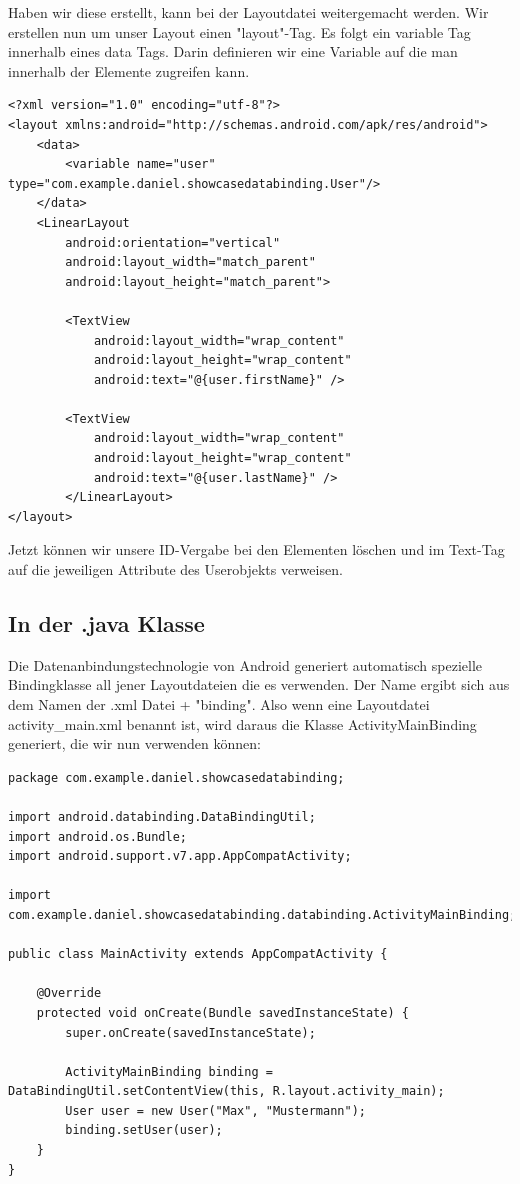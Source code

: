 \documentclass[FIPLY_base.tex]{subfiles}
\begin{document}
Haben wir diese erstellt, kann bei der Layoutdatei weitergemacht werden. Wir erstellen nun um unser Layout einen "layout"-Tag. Es folgt ein variable Tag innerhalb eines data Tags. Darin definieren wir eine Variable auf die man innerhalb der Elemente zugreifen kann.

\begin{lstlisting}[caption={Die XML Datei nach der Integration einer Datenanbindung.},label=DescriptiveLabel]
<?xml version="1.0" encoding="utf-8"?>
<layout xmlns:android="http://schemas.android.com/apk/res/android">
    <data>
	    <variable name="user" type="com.example.daniel.showcasedatabinding.User"/>
    </data>
    <LinearLayout
	    android:orientation="vertical"
	    android:layout_width="match_parent"
	    android:layout_height="match_parent">
    
	    <TextView
	        android:layout_width="wrap_content"
	        android:layout_height="wrap_content"
	        android:text="@{user.firstName}" />
		    
	    <TextView
	        android:layout_width="wrap_content"
	        android:layout_height="wrap_content"
	        android:text="@{user.lastName}" />
	    </LinearLayout>
</layout>
\end{lstlisting}


Jetzt können wir unsere ID-Vergabe bei den Elementen löschen und im Text-Tag auf die jeweiligen Attribute des Userobjekts verweisen.

\newpage
\subsection{In der .java Klasse}
Die Datenanbindungstechnologie von Android generiert automatisch spezielle Bindingklasse all jener Layoutdateien die es verwenden. Der Name ergibt sich aus dem Namen der .xml Datei + "binding". Also wenn eine Layoutdatei activity\_main.xml benannt ist, wird daraus die Klasse ActivityMainBinding generiert, die wir nun verwenden können:

\begin{lstlisting}[caption={Die Aktivitätenklasse nach der Integration einer Datenanbindung.},label=DescriptiveLabel]
package com.example.daniel.showcasedatabinding;

import android.databinding.DataBindingUtil;
import android.os.Bundle;
import android.support.v7.app.AppCompatActivity;

import com.example.daniel.showcasedatabinding.databinding.ActivityMainBinding;

public class MainActivity extends AppCompatActivity {

	@Override
	protected void onCreate(Bundle savedInstanceState) {
		super.onCreate(savedInstanceState);

		ActivityMainBinding binding = DataBindingUtil.setContentView(this, R.layout.activity_main);
		User user = new User("Max", "Mustermann");
		binding.setUser(user);
	}
}
\end{lstlisting}
\end{document}

